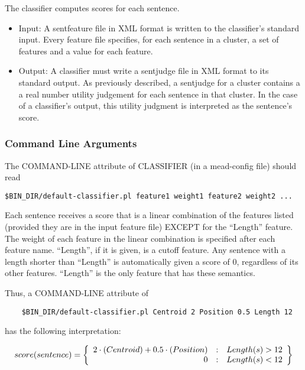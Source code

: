 \documentclass[10pt]{article}
\begin{document}
The classifier computes scores for each sentence.

\begin{itemize}
\item Input:  A sentfeature file in XML format is written to the classifier's
standard input.  Every feature file specifies, for each sentence in a 
cluster, a set of features and a value for each feature.

\item Output: A classifier must write a sentjudge file in XML format to 
its standard output.  As previously described, a sentjudge for a cluster contains a
a real number utility judgement for each sentence in that cluster.
In the case of a classifier's output, this utility judgment is interpreted as the
sentence's score.
\end{itemize}

\subsubsection{Command Line Arguments}

The COMMAND-LINE attribute of CLASSIFIER (in a mead-config file) should read 

\begin{verbatim}
$BIN_DIR/default-classifier.pl feature1 weight1 feature2 weight2 ...
\end{verbatim}

Each sentence receives a
score that is a linear combination of the features listed (provided
they are in the input feature file) EXCEPT for the ``Length'' feature.
The weight of each feature in the linear combination is specified
after each feature name.  ``Length'', if it is given, is a cutoff
feature.  Any sentence
with a length shorter than ``Length'' is automatically given a score of
0, regardless of its other features.  ``Length'' is the only feature that has
these semantics.

Thus, a COMMAND-LINE attribute of

\begin{verbatim}
    $BIN_DIR/default-classifier.pl Centroid 2 Position 0.5 Length 12
\end{verbatim}

\noindent
has the following interpretation:

$$   score(sentence) = \left\{ \begin{array}{r@{\quad:\quad}l}
 2 \cdot (Centroid) + 0.5 \cdot (Position) & Length(s)>12
\\ 0 & Length(s) < 12 \end{array} \right\}   $$
\end{document}
